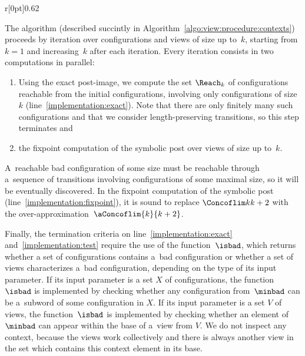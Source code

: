 \noindent%
\begin{wrapfigure}{r}[0pt]{0.62\linewidth}
  \hfill%
  \begin{algorithm}[H]
    \DontPrintSemicolon%
    \caption{Verification Procedure}
    \label{algo:view:procedure:contexts}
  \end{algorithm}
\end{wrapfigure}
%
The algorithm (described succintly in
Algorithm~\ref{algo:view:procedure:contexts}) proceeds by iteration
over configurations and views of size up to~$k$, starting from $k=1$
and increasing~$k$ after each iteration.
%
Every iteration consists in two computations in parallel:
\begin{enumerate}[label={(\alph{*})}]
\item %
  Using the exact post-image, we compute the set $\Reach_k$ of
  configurations reachable from the initial configurations, involving
  only configurations of size~$k$ %
  (line~\ref{implementation:exact}).
  Note that there are only finitely many such configurations and that
  we consider %
  length-preserving transitions,
  so this step terminates and
\item %
  the fixpoint computation of the symbolic post over views of size up
  to~$k$.
\end{enumerate}
%
%
%
A~reachable bad configuration of some size must be reachable through
a~sequence of transitions involving configurations of %
some maximal size, %
so it will be eventually discovered.
%
In the fixpoint computation of the symbolic post
(line~\ref{implementation:fixpoint}), it is sound to replace
$\Concoflim k {k+2}$ with the
over-approximation~$\aConcoflim{k}{k+2}$.


%
Finally, the termination criteria on line~\ref{implementation:exact}
and~\ref{implementation:test} require the use of the
function~$\isbad$, which returns whether a set of configurations
contains a~bad configuration or whether a set of views characterizes
a~bad configuration, depending on the type of its input parameter.
%
If its input parameter is a set $X$ of configurations, the
function~$\isbad$ is implemented by checking whether any configuration
from~$\minbad$ can be a~subword of some configuration in $X$.
%
If its input parameter is a set $V$ of views, the function~$\isbad$ is
implemented by checking whether an element of~$\minbad$ can appear
within the base of a~view from $V$.
%
We do not inspect any context, because the views work collectively and
there is always another view in the set which contains this context
element in its base.

